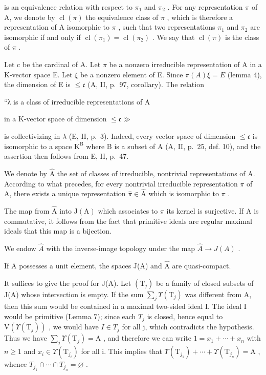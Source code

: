 is an equivalence relation with respect to \(\pi_1\) and \(\pi_2\) . For any representation \(\pi\) of A, we denote by \(\operatorname{cl}(\pi)\) the equivalence class of \(\pi\) , which is therefore a representation of A isomorphic to \(\pi\) , such that two representations \(\pi_1\) and \(\pi_2\) are isomorphic if and only if \(\operatorname{cl}(\pi_1) = \operatorname{cl}(\pi_2)\) . We say that \(\operatorname{cl}(\pi)\) is the class of \(\pi\) .

Let c be the cardinal of A. Let \(\pi\) be a nonzero irreducible representation of A in a K-vector space E. Let \(\xi\) be a nonzero element of E. Since \(\pi(A)\xi = E\) (lemma 4), the dimension of E is \(\leqslant\mathfrak{c}\) (A, II, p.~97, corollary). The relation

“λ is a class of irreducible representations of A

in a K-vector space of dimension \(\leqslant\mathfrak{c}\gg\)

is collectivizing in \(\lambda\) (E, II, p.~3). Indeed, every vector space of dimension \(\leqslant \mathfrak{c}\) is isomorphic to a space \(\mathrm{K}^{\mathrm{B}}\) where B is a subset of A (A, II, p.~25, def. 10), and the assertion then follows from E, II, p.~47.

We denote by \(\widehat{\mathrm{A}}\) the set of classes of irreducible, nontrivial representations of A. According to what precedes, for every nontrivial irreducible representation \(\pi\) of A, there exists a unique representation \(\widehat{\pi} \in \widehat{\mathrm{A}}\) which is isomorphic to \(\pi\) .

The map from \(\hat{\mathrm{A}}\) into \(\mathrm{J(A)}\) which associates to \(\pi\) its kernel is surjective. If A is commutative, it follows from the fact that primitive ideals are regular maximal ideals that this map is a bijection.

We endow \(\hat{A}\) with the inverse-image topology under the map \(\hat{A} \rightarrow J(A)\) .

If A possesses a unit element, the spaces J(A) and \(\hat{\mathrm{A}}\) are quasi-compact.

It suffices to give the proof for J(A). Let \((\mathrm{T}_{j})\) be a family of closed subsets of J(A) whose intersection is empty. If the sum \(\sum_{j}\Upsilon(\mathrm{T}_{j})\) was different from A, then this sum would be contained in a maximal two-sided ideal I. The ideal I would be primitive (Lemma 7); since each \(T_{j}\) is closed, hence equal to \(\mathrm{V}(\Upsilon(\mathrm{T}_{j}))\) , we would have \(I\in T_{j}\) for all j, which contradicts the hypothesis. Thus we have \(\sum_{j}\Upsilon(\mathrm{T}_{j})=\mathrm{A}\) , and therefore we can write \(1=x_{1}+\cdots+x_{n}\) with \(n\geqslant1\) and \(x_{i}\in\Upsilon(\mathrm{T}_{j_{i}})\) for all i. This implies that \(\Upsilon(\mathrm{T}_{j_{1}})+\cdots+\Upsilon(\mathrm{T}_{j_{n}})=\mathrm{A}\) , whence \(T_{j_{1}}\cap\cdots\cap T_{j_{n}}=\varnothing\) .

